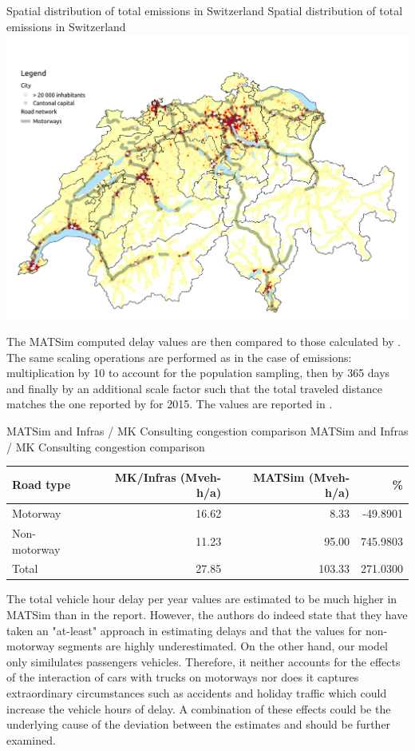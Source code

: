 \createfigure%
{Spatial distribution of total emissions in Switzerland}%
{Spatial distribution of total emissions in Switzerland}%
{\label{fig:spatialDelays}}%
{\includegraphics[width=1.0\textwidth, angle=0]{figures/total_delays_heatmap.pdf}}%
{}

The MATSim computed delay values are then compared to those calculated by \cite{mkinfras2016staukosten}.
The same scaling operations are performed as in the case of emissions: multiplication by 10 to account for the population sampling, then by 365 days and finally by an additional scale factor such that the total traveled distance matches the one reported by \cite{foen2010pollutants} for 2015.
The values are reported in .


\createtable%
{MATSim and Infras / MK Consulting congestion comparison}%
{MATSim and Infras / MK Consulting congestion comparison}%
{\label{tab:delayValueComparison}}%
{%
  \begin{tabular}[c]{lrrr}
    \toprule
    Road type & MK/Infras (Mveh-h/a) & MATSim (Mveh-h/a) & \%  \\ 
    \midrule
    Motorway      & 16.62 &    8.33 &  -49.8901 \\
    Non-motorway  & 11.23 &   95.00 &  745.9803 \\
    Total &         27.85 &  103.33 &  271.0300 \\
    \bottomrule
  \end{tabular}
}%
{}

The total vehicle hour delay per year values are estimated to be much higher in MATSim than in the report.
However, the authors do indeed state that they have taken an "at-least" approach in estimating delays and that the values for non-motorway segments are highly underestimated.
On the other hand, our model only similulates passengers vehicles.
Therefore, it neither accounts for the effects of the interaction of cars with trucks on motorways nor does it captures extraordinary circumstances such as accidents and holiday traffic which could increase the vehicle hours of delay.
A combination of these effects could be the underlying cause of the deviation between the estimates and should be further examined.


